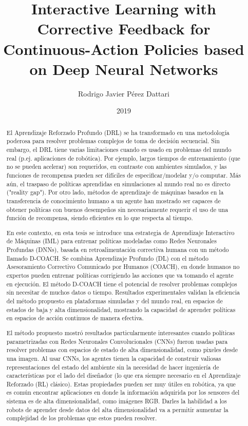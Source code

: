\documentclass[upright, contnum]{umemoria}
\author{Rodrigo Javier Pérez Dattari}
\title{Interactive Learning with Corrective Feedback for Continuous-Action Policies based on Deep Neural Networks}
\date{2019}
\begin{document}
\frontmatter
\maketitle

\begin{abstract}
El Aprendizaje Reforzado Profundo (DRL) se ha transformado en una metodología poderosa para resolver problemas complejos de toma de decisión secuencial. Sin embargo, el DRL tiene varias limitaciones cuando es usado en problemas del mundo real (p.ej. aplicaciones de robótica). Por ejemplo, largos tiempos de entrenamiento (que no se pueden acelerar) son requeridos, en contraste con ambientes simulados, y las funciones de recompensa pueden ser difíciles de especificar/modelar y/o computar. Más aún, el traspaso de políticas aprendidas en simulaciones al mundo real no es directo ("reality gap"). Por otro lado, métodos de aprendizaje de máquinas basados en la transferencia de conocimiento humano a un agente han mostrado ser capaces de obtener políticas con buenos desempeños sin necesariamente requerir el uso de una función de recompensa, siendo eficientes en lo que respecta al tiempo.

En este contexto, en esta tesis se introduce una estrategia de Aprendizaje Interactivo de Máquinas (IML) para entrenar políticas modeladas como Redes Neuronales Profundas (DNNs), basada en retroalimentación correctiva humana con un método llamado D-COACH. Se combina Aprendizaje Profundo (DL) con el método Asesoramiento Correctivo Comunicado por Humanos (COACH), en donde humanos no expertos pueden entrenar políticas corrigiendo las acciones que va tomando el agente en ejecución. El método D-COACH tiene el potencial de resolver problemas complejos sin necesitar de muchos datos o tiempo. Resultados experimentales validan la eficiencia del método propuesto en plataformas simuladas y del mundo real, en espacios de estados de baja y alta dimensionalidad, mostrando la capacidad de aprender políticas en espacios de acción continuos de manera efectiva.

El método propuesto mostró resultados particularmente interesantes cuando políticas parametrizadas con Redes Neuronales Convolucionales (CNNs) fueron usadas para resolver problemas con espacios de estado de alta dimensionalidad, como pixeles desde una imagen. Al usar CNNs, los agentes tienen la capacidad de construir valiosas representaciones del estado del ambiente sin la necesidad de hacer ingeniería de características por el lado del diseñador (lo que era siempre necesario en el Aprendizaje Reforzado (RL) clásico). Estas propiedades pueden ser muy útiles en robótica, ya que es común encontrar aplicaciones en donde la información adquirida por los sensores del sistema es de alta dimensionalidad, como imágenes RGB. Darles la habilidad a los robots de aprender desde datos del alta dimensionalidad va a permitir aumentar la complejidad de los problemas que estos pueden resolver.


\end{abstract}
\end{document}
